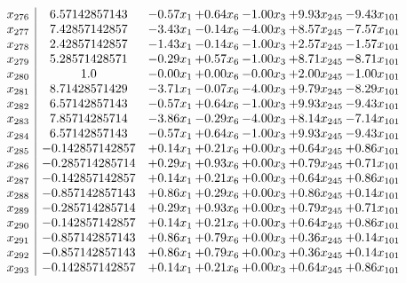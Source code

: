 \documentclass[8pt]{article}
\begin{document}
\[\begin{array}{c| c c@{\hskip 2pt} c@{\hskip 2pt} c@{\hskip 2pt} c@{\hskip 2pt} c@{\hskip 2pt} }
 x_{276}   &  6.57142857143 & -0.57 x_{1} & +  0.64 x_{6} & -1.00 x_{3} & +  9.93 x_{245} & -9.43 x_{101}\\
 x_{277}   &  7.42857142857 & -3.43 x_{1} & -0.14 x_{6} & -4.00 x_{3} & +  8.57 x_{245} & -7.57 x_{101}\\
 x_{278}   &  2.42857142857 & -1.43 x_{1} & -0.14 x_{6} & -1.00 x_{3} & +  2.57 x_{245} & -1.57 x_{101}\\
 x_{279}   &  5.28571428571 & -0.29 x_{1} & +  0.57 x_{6} & -1.00 x_{3} & +  8.71 x_{245} & -8.71 x_{101}\\
 x_{280}   &  1.0 & -0.00 x_{1} & +  0.00 x_{6} & -0.00 x_{3} & +  2.00 x_{245} & -1.00 x_{101}\\
 x_{281}   &  8.71428571429 & -3.71 x_{1} & -0.07 x_{6} & -4.00 x_{3} & +  9.79 x_{245} & -8.29 x_{101}\\
 x_{282}   &  6.57142857143 & -0.57 x_{1} & +  0.64 x_{6} & -1.00 x_{3} & +  9.93 x_{245} & -9.43 x_{101}\\
 x_{283}   &  7.85714285714 & -3.86 x_{1} & -0.29 x_{6} & -4.00 x_{3} & +  8.14 x_{245} & -7.14 x_{101}\\
 x_{284}   &  6.57142857143 & -0.57 x_{1} & +  0.64 x_{6} & -1.00 x_{3} & +  9.93 x_{245} & -9.43 x_{101}\\
 x_{285}   &  -0.142857142857 & +  0.14 x_{1} & +  0.21 x_{6} & +  0.00 x_{3} & +  0.64 x_{245} & +  0.86 x_{101}\\
 x_{286}   &  -0.285714285714 & +  0.29 x_{1} & +  0.93 x_{6} & +  0.00 x_{3} & +  0.79 x_{245} & +  0.71 x_{101}\\
 x_{287}   &  -0.142857142857 & +  0.14 x_{1} & +  0.21 x_{6} & +  0.00 x_{3} & +  0.64 x_{245} & +  0.86 x_{101}\\
 x_{288}   &  -0.857142857143 & +  0.86 x_{1} & +  0.29 x_{6} & +  0.00 x_{3} & +  0.86 x_{245} & +  0.14 x_{101}\\
 x_{289}   &  -0.285714285714 & +  0.29 x_{1} & +  0.93 x_{6} & +  0.00 x_{3} & +  0.79 x_{245} & +  0.71 x_{101}\\
 x_{290}   &  -0.142857142857 & +  0.14 x_{1} & +  0.21 x_{6} & +  0.00 x_{3} & +  0.64 x_{245} & +  0.86 x_{101}\\
 x_{291}   &  -0.857142857143 & +  0.86 x_{1} & +  0.79 x_{6} & +  0.00 x_{3} & +  0.36 x_{245} & +  0.14 x_{101}\\
 x_{292}   &  -0.857142857143 & +  0.86 x_{1} & +  0.79 x_{6} & +  0.00 x_{3} & +  0.36 x_{245} & +  0.14 x_{101}\\
 x_{293}   &  -0.142857142857 & +  0.14 x_{1} & +  0.21 x_{6} & +  0.00 x_{3} & +  0.64 x_{245} & +  0.86 x_{101}\\

\end{array}\]
\end{document}
